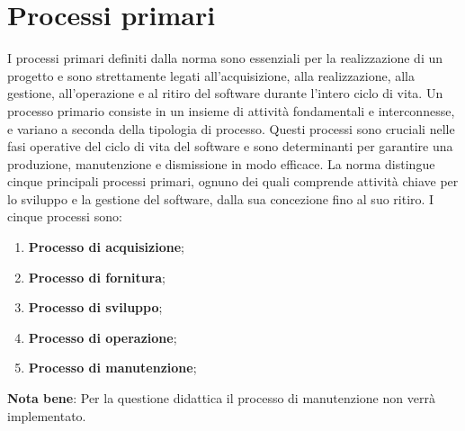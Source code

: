 \section{Processi primari}
\label{sec:Processi_Primari}
I processi primari definiti dalla norma  sono essenziali per la realizzazione di un progetto e sono strettamente legati all'acquisizione, alla realizzazione, alla gestione, all'operazione e al ritiro del software durante l'intero ciclo di vita. 
Un processo primario consiste in un insieme di attività fondamentali e interconnesse, e variano a seconda della tipologia di processo.
Questi processi sono cruciali nelle fasi operative del ciclo di vita del software e sono determinanti per garantire una produzione, manutenzione e dismissione in modo efficace. La norma distingue cinque principali processi primari, ognuno dei quali comprende attività chiave per lo sviluppo e la gestione del software, dalla sua concezione fino al suo ritiro.
I cinque processi sono:
\begin{enumerate}
    \item \textbf{Processo di acquisizione}; 
    \item \textbf{Processo di fornitura}; 
    \item \textbf{Processo di sviluppo};
    \item \textbf{Processo di operazione}; 
    \item \textbf{Processo di manutenzione};
\end{enumerate}
\textbf{Nota bene}: Per la questione didattica il processo di manutenzione non verrà implementato.





